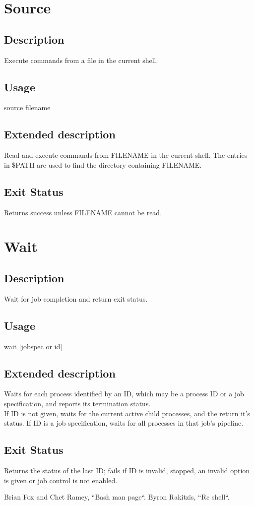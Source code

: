 \documentclass[12pt,a4paper]{report}
\begin{document}
\chapter{Source}
\section{Description}
Execute commands from a file in the current shell.
\section{Usage}
source filename
\section{Extended description}
Read and execute commands from FILENAME in the current shell.  The entries in \$PATH are used to find the directory containing FILENAME.
\section{Exit Status}
Returns success unless FILENAME cannot be read.
\newpage

\chapter{Wait}
\section{Description}
Wait for job completion and return exit status.
\section{Usage}
wait [jobspec or id]
\section{Extended description}
Waits for each process identified by an ID, which may be a process ID or a job specification, and reports its termination status.\\
If ID is not given, waits for the current active child processes, and the return it's status. If ID is a job specification, waits for all processes in that job's pipeline.
\section{Exit Status}
Returns the status of the last ID; fails if ID is invalid, stopped, an invalid option is given or job control is not enabled.
\newpage
\begin{thebibliography}{100} %
	 Brian Fox and Chet Ramey, ``Bash man page``.
	 Byron Rakitzis, ``Rc shell``.
\end{thebibliography}
\end{document}
